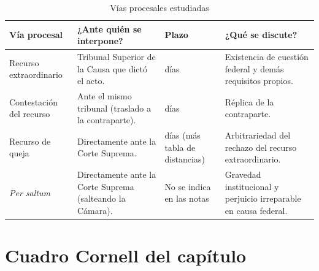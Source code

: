 \documentclass[12pt,oneside]{book}
\begin{document}
\begin{table}[H]
\centering
\caption{Vías procesales estudiadas}
\renewcommand{\arraystretch}{1.2}
\begin{tabularx}{\textwidth}{
    >{\raggedright\arraybackslash}p{}
    >{\raggedright\arraybackslash}X
    >{\raggedright\arraybackslash}p{}
    >{\raggedright\arraybackslash}X
}
\toprule
\textbf{Vía procesal} &
\textbf{¿Ante quién se interpone?} &
\textbf{Plazo} &
\textbf{¿Qué se discute?} \\
\midrule
Recurso extraordinario &
Tribunal Superior de la Causa que dictó el acto. &
10 días &
Existencia de cuestión federal y demás requisitos propios. \\
\addlinespace
Contestación del recurso &
Ante el mismo tribunal (traslado a la contraparte). &
10 días &
Réplica de la contraparte. \\
\addlinespace
Recurso de queja &
Directamente ante la Corte Suprema. &
5 días (más tabla de distancias) &
Arbitrariedad del rechazo del recurso extraordinario. \\
\addlinespace
\textit{Per saltum} &
Directamente ante la Corte Suprema (salteando la Cámara). &
No se indica en las notas &
Gravedad institucional y perjuicio irreparable en causa federal. \\
\bottomrule
\end{tabularx}
\end{table}

\section{Cuadro Cornell del capítulo}
\end{document}
